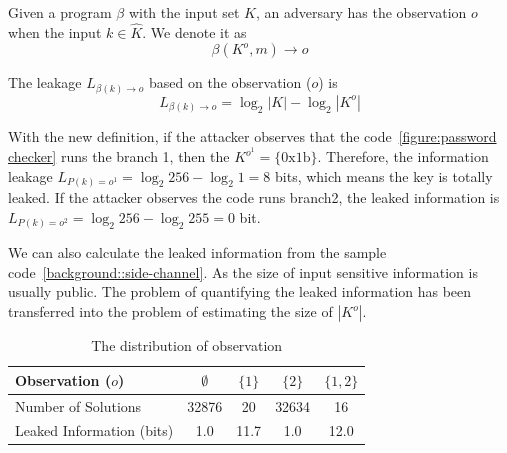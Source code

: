 \begin{mydef}
\label{def}
Given a program $\beta$ with the input set $K$, 
an adversary has the observation $o$ when the input $k{\in}\hat{K}$. 
We denote it as
$$\beta(K^o, m) \rightarrow	o$$

The leakage $L_{\beta(k)\rightarrow o}$ based on the observation ($o$) is
    $$L_{\beta(k)\rightarrow o} = \log_2{|K|} - \log_2{|K^o|}$$
\end{mydef}

With the new definition, if the attacker observes that the code~\ref{figure:password checker} runs the branch 1, 
then the $K^{o^{1}} = \{\mathrm{0x1b}\}$. Therefore, the information leakage $L_{P(k)=o^{1}} = \log_2{256} - \log_2{1} = 8$
bits, which means the key is totally leaked. If the attacker observes the code runs branch2, the leaked information is 
$L_{P(k)=o^{2}} = \log_2{256} - \log_2{255} = 0$ bit.


We can also calculate the leaked information
from the sample code~\ref{background::side-channel}. As the size of input 
sensitive information is usually public. The problem of quantifying the
leaked information has been transferred into the problem of estimating
the size of $|K^o|$.

\begin{table}[ht]
    \centering


\begin{tabular}{l|cccc}
    \hline
Observation ($o$)  & $\emptyset$ & ${\{1\}}$ & ${\{2\}}$ & ${\{1, 2\}}$ \\ \hline
Number of Solutions &  32876 & 20 & 32634 & 16 \\ \hline
Leaked Information (bits)     & 1.0 & 11.7 & 1.0  & 12.0   \\
    \hline
\end{tabular}
\caption{The distribution of observation}
\label{shtable}
\end{table}

